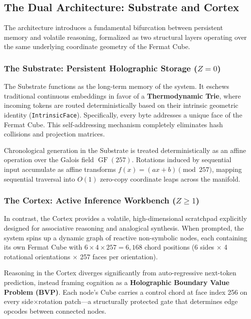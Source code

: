 \subsection{The Dual Architecture: Substrate and Cortex}
\label{sec:dual_architecture}

The architecture introduces a fundamental bifurcation between persistent memory and volatile reasoning, formalized as two structural layers operating over the same underlying coordinate geometry of the Fermat Cube.

\subsubsection{The Substrate: Persistent Holographic Storage ($Z = 0$)}
The Substrate functions as the long-term memory of the system. It eschews traditional continuous embeddings in favor of a \textbf{Thermodynamic Trie}, where incoming tokens are routed deterministically based on their intrinsic geometric identity (\texttt{IntrinsicFace}). Specifically, every byte addresses a unique face of the Fermat Cube. This self-addressing mechanism completely eliminates hash collisions and projection matrices.

Chronological generation in the Substrate is treated deterministically as an affine operation over the Galois field $\operatorname{GF}(257)$. Rotations induced by sequential input accumulate as affine transforms $f(x) = (ax + b) \pmod{257}$, mapping sequential traversal into $O(1)$ zero-copy coordinate leaps across the manifold.

\subsubsection{The Cortex: Active Inference Workbench ($Z \ge 1$)}
In contrast, the Cortex provides a volatile, high-dimensional scratchpad explicitly designed for associative reasoning and analogical synthesis. When prompted, the system spins up a dynamic graph of reactive non-symbolic nodes, each containing its own Fermat Cube with $6 \times 4 \times 257 = 6{,}168$ chord positions (6 sides $\times$ 4 rotational orientations $\times$ 257 faces per orientation).

Reasoning in the Cortex diverges significantly from auto-regressive next-token prediction, instead framing cognition as a \textbf{Holographic Boundary Value Problem (BVP)}. Each node's Cube carries a control chord at face index 256 on every side$\times$rotation patch---a structurally protected gate that determines edge opcodes between connected nodes.

